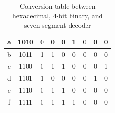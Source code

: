 \documentclass[12pt]{article}
\begin{document}
\begin{table}[h]
\begin{tabular}{ | c | c | c | c | c | c | c | c | c | }
  a                                                                      & 1010                                                                    & 0                             & 0                             & 0                             & 1                             & 0                             & 0                             & 0                             \\ \hline \rule{0em}{1.15em}
  b                                                                      & 1011                                                                    & 1                             & 1                             & 0                             & 0                             & 0                             & 0                             & 0                             \\ \hline \rule{0em}{1.15em}
  c                                                                      & 1100                                                                    & 0                             & 1                             & 1                             & 0                             & 0                             & 0                             & 1                             \\ \hline \rule{0em}{1.15em}
  d                                                                      & 1101                                                                    & 1                             & 0                             & 0                             & 0                             & 0                             & 1                             & 0                             \\ \hline \rule{0em}{1.15em}
  e                                                                      & 1110                                                                    & 0                             & 1                             & 1                             & 0                             & 0                             & 0                             & 0                             \\ \hline \rule{0em}{1.15em}
  f                                                                      & 1111                                                                    & 0                             & 1                             & 1                             & 1                             & 0                             & 0                             & 0                             \\ \hline
  \end{tabular}
  \caption{Conversion table between hexadecimal, 4-bit binary, and seven-segment decoder}
  \label{table:1}
\end{table}
\end{document}
